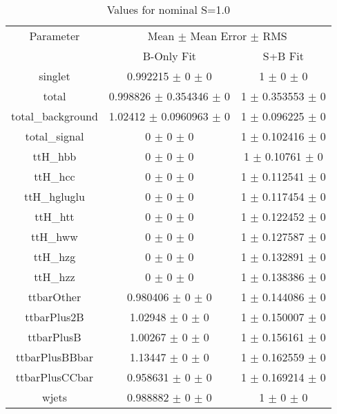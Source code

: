 \begin{table}
\centering
\caption{Values for nominal S=1.0}
\begin{tabular}{ccc}
\toprule
Parameter & \multicolumn{2}{c}{Mean $\pm$ Mean Error $\pm$ RMS}\\
 & B-Only Fit & S+B Fit\\
\midrule
singlet & \num{0.992215} $\pm$ \num{0} $\pm$ \num{0} & \num{1} $\pm$ \num{0} $\pm$ \num{0}\\
total & \num{0.998826} $\pm$ \num{0.354346} $\pm$ \num{0} & \num{1} $\pm$ \num{0.353553} $\pm$ \num{0}\\
total\_background & \num{1.02412} $\pm$ \num{0.0960963} $\pm$ \num{0} & \num{1} $\pm$ \num{0.096225} $\pm$ \num{0}\\
total\_signal & \num{0} $\pm$ \num{0} $\pm$ \num{0} & \num{1} $\pm$ \num{0.102416} $\pm$ \num{0}\\
ttH\_hbb & \num{0} $\pm$ \num{0} $\pm$ \num{0} & \num{1} $\pm$ \num{0.10761} $\pm$ \num{0}\\
ttH\_hcc & \num{0} $\pm$ \num{0} $\pm$ \num{0} & \num{1} $\pm$ \num{0.112541} $\pm$ \num{0}\\
ttH\_hgluglu & \num{0} $\pm$ \num{0} $\pm$ \num{0} & \num{1} $\pm$ \num{0.117454} $\pm$ \num{0}\\
ttH\_htt & \num{0} $\pm$ \num{0} $\pm$ \num{0} & \num{1} $\pm$ \num{0.122452} $\pm$ \num{0}\\
ttH\_hww & \num{0} $\pm$ \num{0} $\pm$ \num{0} & \num{1} $\pm$ \num{0.127587} $\pm$ \num{0}\\
ttH\_hzg & \num{0} $\pm$ \num{0} $\pm$ \num{0} & \num{1} $\pm$ \num{0.132891} $\pm$ \num{0}\\
ttH\_hzz & \num{0} $\pm$ \num{0} $\pm$ \num{0} & \num{1} $\pm$ \num{0.138386} $\pm$ \num{0}\\
ttbarOther & \num{0.980406} $\pm$ \num{0} $\pm$ \num{0} & \num{1} $\pm$ \num{0.144086} $\pm$ \num{0}\\
ttbarPlus2B & \num{1.02948} $\pm$ \num{0} $\pm$ \num{0} & \num{1} $\pm$ \num{0.150007} $\pm$ \num{0}\\
ttbarPlusB & \num{1.00267} $\pm$ \num{0} $\pm$ \num{0} & \num{1} $\pm$ \num{0.156161} $\pm$ \num{0}\\
ttbarPlusBBbar & \num{1.13447} $\pm$ \num{0} $\pm$ \num{0} & \num{1} $\pm$ \num{0.162559} $\pm$ \num{0}\\
ttbarPlusCCbar & \num{0.958631} $\pm$ \num{0} $\pm$ \num{0} & \num{1} $\pm$ \num{0.169214} $\pm$ \num{0}\\
wjets & \num{0.988882} $\pm$ \num{0} $\pm$ \num{0} & \num{1} $\pm$ \num{0} $\pm$ \num{0}\\
\bottomrule
\end{tabular}
\end{table}